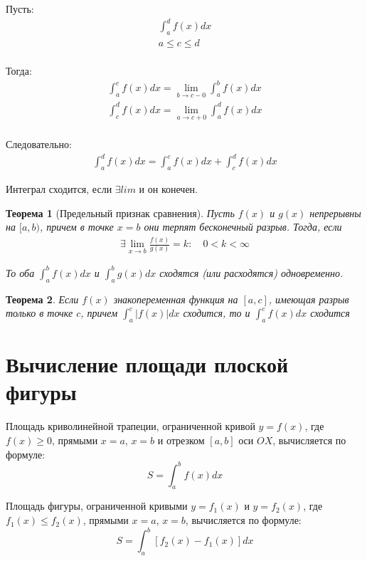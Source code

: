 \documentclass[a4paper,12pt,oneside]{extbook}
\theoremstyle{numbered}
\theoremstyle{unnumbered}
\theoremstyle{named}
\newtheorem{theorem}{Теорема}[section]
\theoremstyle{unnumbered}
\theoremstyle{named}
\theoremstyle{named}
\theoremstyle{named}
\begin{document}
Пусть:
\begin{gather*}
    \int_a^d f(x)dx \\
    a\leq c \leq d \\
\end{gather*}

Тогда:
\begin{gather*}
    \int_a^c f(x)dx = \lim_{b \to c - 0}{\int_a^b f(x)dx} \\
    \int_c^d f(x)dx = \lim_{a \to c + 0}{\int_a^d f(x)dx} \\
\end{gather*}

Следовательно:
\begin{gather*}
    \int_a^d f(x)dx = \int_a^c f(x)dx + \int_c^d f(x)dx
\end{gather*}

Интеграл сходится, если \(\exists lim{}{}\) и он конечен.

\begin{theorem}[Предельный признак сравнения]
    Пусть \(f(x)\) и \(g(x)\) непрерывны на \([a, b)\), причем в точке \(x = b\) они терпят бесконечный разрыв. Тогда, если
    \begin{gather*}
        \exists \lim_{x \to b}{\frac{f(x)}{g(x)}} = k: \quad 0 < k < \infty
    \end{gather*}

    То оба \(\int_a^b f(x)dx\) и \(\int_a^b g(x)dx\) сходятся (или расходятся) одновременно.
\end{theorem}

\begin{theorem}
    Если \(f(x)\) знакопеременная функция на \([a, c]\), имеющая разрыв только в точке \(c\), причем \(\int_a^c |f(x)| dx\) сходится, то и \(\int_a^c f(x) dx\) сходится
\end{theorem}

\section{Вычисление площади плоской фигуры}%
\label{sec:Вычисление площади плоской фигуры}

Площадь криволинейной трапеции, ограниченной кривой \(y = f(x)\), где \(f(x) \geq 0\), прямыми \(x = a\), \(x = b\) и отрезком \([a, b]\) оси \(OX\), вычисляется по формуле:
\[
    S = \int_a^b f(x)dx
\]

Площадь фигуры, ограниченной кривыми \(y = f_1(x)\) и \(y = f_2(x)\), где \(f_1(x) \leq f_2(x)\), прямыми \(x = a\), \(x = b\), вычисляется по формуле:
\[
    S = \int_a^b [f_2(x) - f_1(x)]dx
\]
\end{document}
